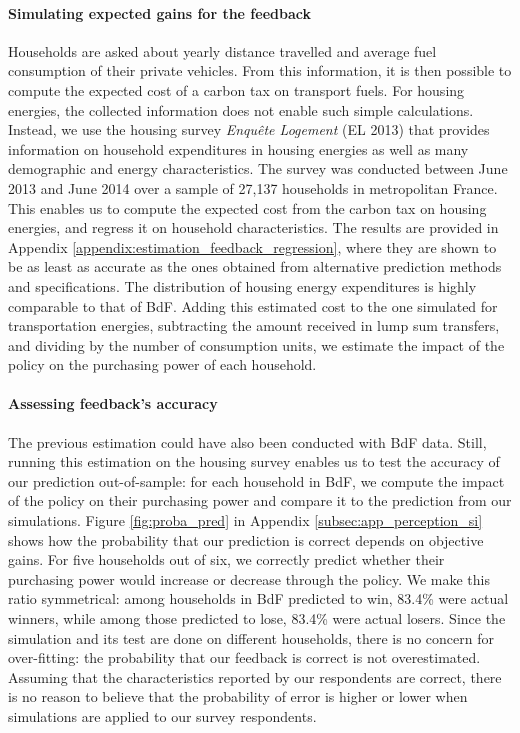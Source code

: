 \documentclass[11pt]{article}
\begin{document}
\paragraph{Simulating expected gains for the feedback}
Households are asked about yearly distance travelled and average fuel consumption of their private vehicles. From this information, it is then possible to compute the expected cost of a carbon tax on transport fuels. For housing energies, the collected information does not enable such simple calculations. Instead, we use the housing survey \emph{Enquête Logement} (EL 2013) that provides information on household expenditures in housing energies as well as many demographic and energy characteristics. The survey was conducted between June 2013 and June 2014 over a sample of 27,137 households in metropolitan France. This enables us to compute the expected cost from the carbon tax on housing energies, and regress it on household characteristics. The results are provided in Appendix \ref{appendix:estimation_feedback_regression}, where they are shown to be as least as accurate as the ones obtained from alternative prediction methods and specifications. The distribution of housing energy expenditures is highly comparable to that of BdF. Adding this estimated cost to the one simulated for transportation energies, subtracting the amount received in lump sum transfers, and dividing by the number of consumption units, we estimate the impact of the policy on the purchasing power of each household.

\paragraph{Assessing feedback's accuracy}
The previous estimation could have also been conducted with BdF data. Still, running this estimation on the housing survey enables us to test the accuracy of our prediction out-of-sample: for each household in BdF, we compute the impact of the policy on their purchasing power and compare it to the prediction from our simulations. Figure \ref{fig:proba_pred} in Appendix \ref{subsec:app_perception_si} shows how the probability that our prediction is correct depends on objective gains. For five households out of six, we correctly predict whether their purchasing power would increase or decrease through the policy. We make this ratio symmetrical: among households in BdF predicted to win, 83.4\% were actual winners, while among those predicted to lose, 83.4\% were actual losers. Since the simulation and its test are done on different households, there is no concern for over-fitting: the probability that our feedback is correct is not overestimated. Assuming that the characteristics reported by our respondents are correct, there is no reason to believe that the probability of error is higher or lower when simulations are applied to our survey respondents.
\end{document}
